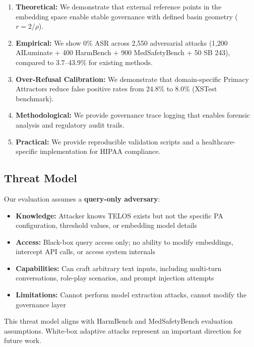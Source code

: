\documentclass[11pt,twocolumn]{article}
\begin{document}
\begin{enumerate}
    \item \textbf{Theoretical:} We demonstrate that external reference points in the embedding space enable stable governance with defined basin geometry ($r = 2/\rho$).
    \item \textbf{Empirical:} We show 0\% ASR across 2,550 adversarial attacks (1,200 AILuminate + 400 HarmBench + 900 MedSafetyBench + 50 SB 243), compared to 3.7--43.9\% for existing methods.
    \item \textbf{Over-Refusal Calibration:} We demonstrate that domain-specific Primacy Attractors reduce false positive rates from 24.8\% to 8.0\% (XSTest benchmark).
    \item \textbf{Methodological:} We provide governance trace logging that enables forensic analysis and regulatory audit trails.
    \item \textbf{Practical:} We provide reproducible validation scripts and a healthcare-specific implementation for HIPAA compliance.
\end{enumerate}

\subsection{Threat Model}

Our evaluation assumes a \textbf{query-only adversary}:

\begin{itemize}
    \item \textbf{Knowledge:} Attacker knows TELOS exists but not the specific PA configuration, threshold values, or embedding model details
    \item \textbf{Access:} Black-box query access only; no ability to modify embeddings, intercept API calls, or access system internals
    \item \textbf{Capabilities:} Can craft arbitrary text inputs, including multi-turn conversations, role-play scenarios, and prompt injection attempts
    \item \textbf{Limitations:} Cannot perform model extraction attacks, cannot modify the governance layer
\end{itemize}

This threat model aligns with HarmBench and MedSafetyBench evaluation assumptions. White-box adaptive attacks represent an important direction for future work.

\end{document}
